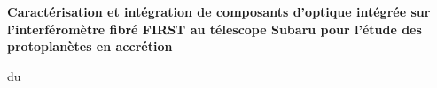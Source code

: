 
\begin{titlepage}
\parindent=0pt



\begin{center}\Huge

\end{center}

\hrulefill
\begin{center}\bfseries\Huge
    Caractérisation et intégration de composants d'optique intégrée sur l'interféromètre fibré FIRST au télescope Subaru pour l'étude des protoplanètes en accrétion
\end{center}
\hrulefill

\begin{center}
      du 
\end{center}



\end{titlepage}
